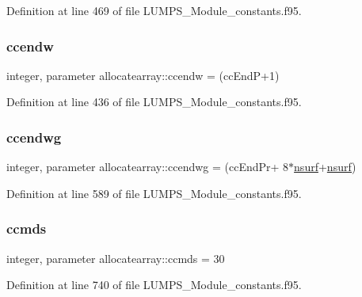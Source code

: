 Definition at line 469 of file L\+U\+M\+P\+S\+\_\+\+Module\+\_\+constants.\+f95.

\mbox{\label{namespaceallocatearray_a2390a4cc2be9de4c4617bd8d62d3fec5}} 
\subsubsection{\texorpdfstring{ccendw}{ccendw}}
{\footnotesize\ttfamily integer, parameter allocatearray\+::ccendw = (cc\+EndP+1)}



Definition at line 436 of file L\+U\+M\+P\+S\+\_\+\+Module\+\_\+constants.\+f95.

\mbox{\label{namespaceallocatearray_a8a78b81f97b58eabdf3093c545cbd9f5}} 
\subsubsection{\texorpdfstring{ccendwg}{ccendwg}}
{\footnotesize\ttfamily integer, parameter allocatearray\+::ccendwg = (cc\+End\+Pr+ 8$\ast$\hyperlink{namespaceallocatearray_acd22f92a06f7e9a2a91426b3dc99fdb0}{nsurf}+\hyperlink{namespaceallocatearray_acd22f92a06f7e9a2a91426b3dc99fdb0}{nsurf})}



Definition at line 589 of file L\+U\+M\+P\+S\+\_\+\+Module\+\_\+constants.\+f95.

\mbox{\label{namespaceallocatearray_abfa2ffdfa390b59bfba25c0870b6da2c}} 
\subsubsection{\texorpdfstring{ccmds}{ccmds}}
{\footnotesize\ttfamily integer, parameter allocatearray\+::ccmds = 30}



Definition at line 740 of file L\+U\+M\+P\+S\+\_\+\+Module\+\_\+constants.\+f95.

\mbox{\label{namespaceallocatearray_a93cbccce6abf3ac7e437099b001937d2}} 
